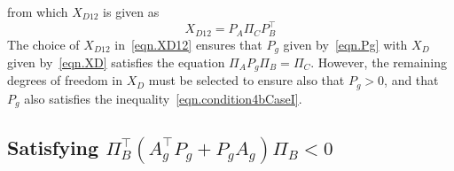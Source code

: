 \documentclass[journal]{IEEEtran}
\theoremstyle{innercustomthm}
\begin{document}
  from which $X_{D12}$ is given as
  \begin{equation}
    \label{eqn.XD12}
    X_{D12} = P_{A}\Pi_{C}P_{B}^{\top}
  \end{equation}
  The choice of $X_{D12}$ in\ \eqref{eqn.XD12} ensures that $P_{g}$ given by\ \eqref{eqn.Pg} with $X_{D}$ given by\ \eqref{eqn.XD} satisfies the equation $\Pi_{A}P_{g}\Pi_{B}=\Pi_{C}$.
  However, the remaining degrees of freedom in $X_{D}$ must be selected to ensure also that $P_{g}>0$, and that $P_{g}$ also satisfies the inequality\ \eqref{eqn.condition4bCaseI}.

  \subsection{Satisfying \texorpdfstring{$\Pi_{B}^{\top} (A_{g}^{\top}P_{g} + P_{g}A_{g}) \Pi_{B} < 0$}{}}
\end{document}
